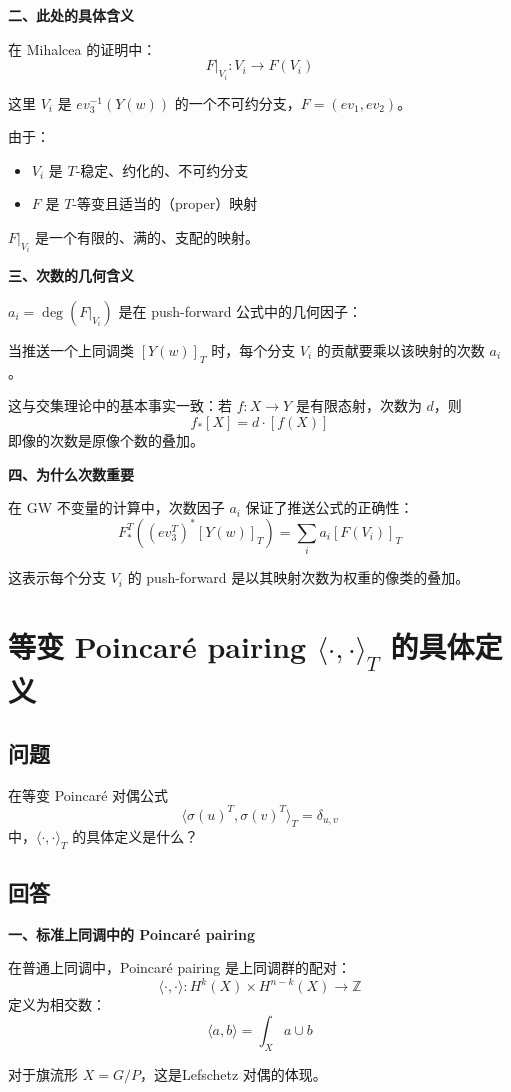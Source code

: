 \textbf{二、此处的具体含义}

在 Mihalcea 的证明中：
$$F|_{V_i} : V_i \to F(V_i)$$

这里 $V_i$ 是 $ev_3^{-1}(Y(w))$ 的一个不可约分支，$F = (ev_1, ev_2)$。

由于：
\begin{itemize}
\item $V_i$ 是 $T$-稳定、约化的、不可约分支
\item $F$ 是 $T$-等变且适当的（proper）映射
\end{itemize}

$F|_{V_i}$ 是一个有限的、满的、支配的映射。

\textbf{三、次数的几何含义}

$a_i = \deg(F|_{V_i})$ 是在 push-forward 公式中的几何因子：

当推送一个上同调类 $[Y(w)]_T$ 时，每个分支 $V_i$ 的贡献要乘以该映射的次数 $a_i$。

这与交集理论中的基本事实一致：若 $f: X \to Y$ 是有限态射，次数为 $d$，则
$$f_*[X] = d \cdot [f(X)]$$
即像的次数是原像个数的叠加。

\textbf{四、为什么次数重要}

在 GW 不变量的计算中，次数因子 $a_i$ 保证了推送公式的正确性：
$$F_*^T\left((ev_3^T)^*[Y(w)]_T\right) = \sum_i a_i [F(V_i)]_T$$

这表示每个分支 $V_i$ 的 push-forward 是以其映射次数为权重的像类的叠加。

\section{等变 Poincaré pairing $\langle \cdot, \cdot \rangle_T$ 的具体定义}\label{sec:qa-equivariant-poincare-pairing}
\subsection{问题}
在等变 Poincaré 对偶公式
$$\langle \sigma(u)^T, \sigma(v)^T \rangle_T = \delta_{u,v}$$
中，$\langle \cdot, \cdot \rangle_T$ 的具体定义是什么？
\subsection{回答}
\textbf{一、标准上同调中的 Poincaré pairing}

在普通上同调中，Poincaré pairing 是上同调群的配对：
$$\langle \cdot, \cdot \rangle: H^k(X) \times H^{n-k}(X) \to \mathbb{Z}$$
定义为相交数：
$$\langle a, b \rangle = \int_X a \cup b$$

对于旗流形 $X = G/P$，这是Lefschetz 对偶的体现。

